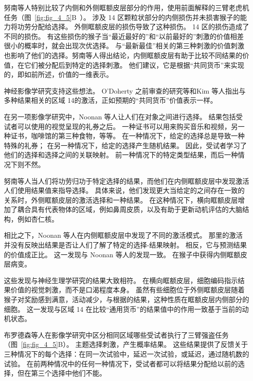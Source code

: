 努南等人\cite{noonan2010separate}特别比较了内侧和外侧眶额皮层部分的作用，使用前面解释的三臂老虎机任务（图~\ref{fig:fig_4_5}B~）。
涉及 14 区颗粒状部分的内侧损伤并未损害猴子的能力将功劳分配给选择。
外侧眶额皮层的损伤导致了这种损伤。
14 区的损伤造成了不同的损伤。
有这些损伤的猴子当“最近最好的”和“以前最好的”刺激的价值相差很小的概率时，就会出现次优选择。
与“最新最佳”相关的第三种刺激的价值刺激也影响了他们的选择。努南等人得出结论，内侧眶额皮层有助于比较不同结果的价值，在它们被分配后到特定的选择刺激。
他们建议，它是根据“共同货币”来实现的，即如前所述，价值的一维表示。\par


神经影像学研究支持这些想法。
O'Doherty\cite{o2001abstract} 之前审查的研究等和Kim 等人\cite{kim2011overlapping}指出与多种结果相关的区域 14的激活，正如预期的“共同货币”价值表示一样。\par


在另一项影像学研究中，Noonan 等人\cite{noonan2011distinct}让人们在对象之间进行选择。
结果包括受试者可以使用的视觉呈现的礼券之后。
一种证书可以用来购买音乐和视频，另一种证书，咖啡馆的第三种食物，等等。
在一种情况下，给定的选择总是导致一种特殊的礼券； 在另一种情况下，给定的选择产生随机结果。
因此，受试者学习了他们的选择和选择之间的关联映射。
前一种情况下的特定类型结果，而后一种情况下则不然。\par


努南等人当人们将功劳归功于特定选择的结果，而他们在内侧眶额皮层中发现激活人们使用结果值来指导选择。
具体来说，他们发现更大当给定的之间存在一致的关系时，外侧眶额皮层的激活选择和一种结果。
在这种情况下，横向眶额皮层增加了耦合具有代表物体的区域，例如鼻周皮质，以及有助于更新动机评估的大脑结构，例如杏仁核。\par


相比之下，Noonan 等人在内侧眶额皮层中发现了不同的激活模式。
那里的激活并没有反映出结果是否让人们了解了特定的选择-结果映射。
相反，它与预测结果的价值成正比。
这一发现与 Noonan 等人的发现一致\cite{noonan2010separate}。
在猴子中获得内侧眶额皮层病变。\par


这些发现与神经生理学研究的结果大致相符。
在横向眶额皮层，细胞编码指示结果价值的视觉刺激，而不是口渴程度本身\cite{bouret2010ventromedial}。
虽然有些细胞位于外侧眶额皮层随着猴子对奖励感到满意，活动减少，与根据\cite{critchley1996hunger}的结果，这种性质在眶额皮层内侧部分的细胞\cite{bouret2010ventromedial}。
这一发现与区域 14 在比较“通用货币”的结果值中的作用一致基于当前的动机状态。\par


布罗德森等人\cite{brodersenorbitofrontal}在影像学研究中区分相同区域哪些受试者执行了三臂强盗任务（图~\ref{fig:fig_4_5}B）。
主题选择刺激，产生概率结果。
这些结果提供了反馈关于三种情况下的每个选择：在同一次试验中，延迟一次试验，或延迟，通过随机数的试验。
在前两种情况中的任何一种情况下，受试者都可以将结果分配给以前的选择，但在第三个选择中他们不能。\par


